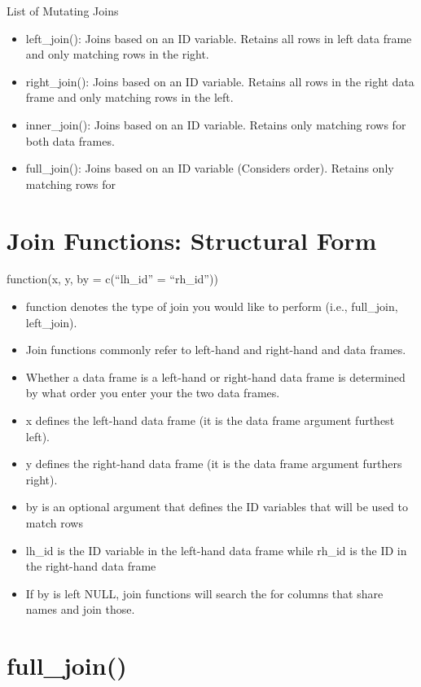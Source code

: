 \documentclass[]{book}
\providecommand{\tightlist}{%
  \setlength{\itemsep}{0pt}\setlength{\parskip}{0pt}}
\theoremstyle{definition}
\theoremstyle{definition}
\theoremstyle{definition}
\theoremstyle{remark}
\begin{document}
List of Mutating Joins

\begin{itemize}
\tightlist
\item
  left\_join(): Joins based on an ID variable. Retains all rows in left data frame and only matching rows in the right.
\item
  right\_join(): Joins based on an ID variable. Retains all rows in the right data frame and only matching rows in the left.
\item
  inner\_join(): Joins based on an ID variable. Retains only matching rows for both data frames.
\item
  full\_join(): Joins based on an ID variable (Considers order). Retains only matching rows for
\end{itemize}

\hypertarget{joinform}{%
\section{Join Functions: Structural Form}\label{joinform}}

function(x, y, by = c(``lh\_id'' = ``rh\_id''))

\begin{itemize}
\tightlist
\item
  function denotes the type of join you would like to perform (i.e., full\_join, left\_join).
\item
  Join functions commonly refer to left-hand and right-hand and data frames.
\item
  Whether a data frame is a left-hand or right-hand data frame is determined by what order you enter your the two data frames.
\item
  x defines the left-hand data frame (it is the data frame argument furthest left).
\item
  y defines the right-hand data frame (it is the data frame argument furthers right).
\item
  by is an optional argument that defines the ID variables that will be used to match rows
\item
  lh\_id is the ID variable in the left-hand data frame while rh\_id is the ID in the right-hand data frame
\item
  If by is left NULL, join functions will search the for columns that share names and join those.
\end{itemize}

\hypertarget{full_join}{%
\section{full\_join()}\label{full_join}}
\end{document}
